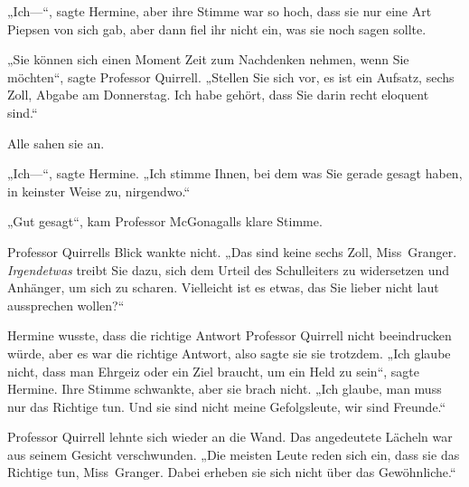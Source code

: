 „Ich—“, sagte Hermine, aber ihre Stimme war so hoch, dass sie nur eine Art Piepsen von sich gab, aber dann fiel ihr nicht ein, was sie noch sagen sollte.

„Sie können sich einen Moment Zeit zum Nachdenken nehmen, wenn Sie möchten“, sagte Professor Quirrell.
„Stellen Sie sich vor, es ist ein Aufsatz, sechs Zoll, Abgabe am Donnerstag. Ich habe gehört, dass Sie darin recht eloquent sind.“

Alle sahen sie an.

„Ich—“, sagte Hermine.
„Ich stimme Ihnen, bei dem was Sie gerade gesagt haben, in keinster Weise zu, nirgendwo.“

„Gut gesagt“, kam Professor McGonagalls klare Stimme.

Professor Quirrells Blick wankte nicht.
„Das sind keine sechs Zoll, Miss~Granger. \emph{Irgendetwas} treibt Sie dazu, sich dem Urteil des Schulleiters zu widersetzen und Anhänger, um sich zu scharen. Vielleicht ist es etwas, das Sie lieber nicht laut aussprechen wollen?“

Hermine wusste, dass die richtige Antwort Professor Quirrell nicht beeindrucken würde, aber es war die richtige Antwort, also sagte sie sie trotzdem.
„Ich glaube nicht, dass man Ehrgeiz oder ein Ziel braucht, um ein Held zu sein“, sagte Hermine. Ihre Stimme schwankte, aber sie brach nicht.
„Ich glaube, man muss nur das Richtige tun. Und sie sind nicht meine Gefolgsleute, wir sind Freunde.“

Professor Quirrell lehnte sich wieder an die Wand. Das angedeutete Lächeln war aus seinem Gesicht verschwunden.
„Die meisten Leute reden sich ein, dass sie das Richtige tun, Miss~Granger. Dabei erheben sie sich nicht über das Gewöhnliche.“

